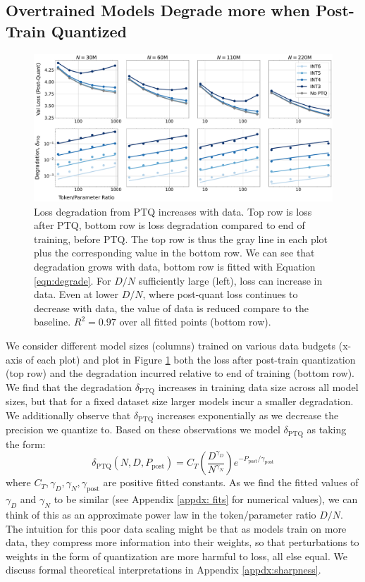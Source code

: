 \documentclass[11pt]{article}
\begin{document}
\subsection{Overtrained Models Degrade more when Post-Train Quantized}

\begin{figure}
    \centering
    \includegraphics[width=\linewidth]{tpr_gptq_new_evals.pdf}
    \caption{Loss degradation from PTQ increases with data. Top row is loss after PTQ, bottom row is loss degradation compared to end of training, before PTQ. The top row is thus the gray line in each plot plus the corresponding value in the bottom row. We can see that degradation grows with data, bottom row is fitted with Equation \ref{eqn:degrade}. For $D/N $ sufficiently large (left), loss can increase in data. Even at lower $D/N$, where post-quant loss continues to decrease with data, the value of data is reduced compare to the baseline. $R^2 = 0.97$ over all fitted points (bottom row).}
    \label{fig:tpr}
\end{figure}

We consider different model sizes (columns) trained on various data budgets (x-axis of each plot) and plot in Figure \ref{fig:tpr} both the loss after post-train quantization (top row) and the degradation incurred relative to end of training (bottom row). We find that the degradation $\delta_\text{PTQ}$ increases in training data size across all model sizes, but that for a fixed dataset size larger models incur a smaller degradation. We additionally observe that $\delta_{\text{PTQ}}$ increases exponentially as we decrease the precision we quantize to.
Based on these observations we model $\delta_\text{PTQ}$ as taking the form:
\begin{equation}
\label{eqn:degrade}
    \delta_\text{PTQ}(N, D, P_\text{post}) = C_T \left(\frac{D^{\gamma_D}}{N^{\gamma_N}}\right) e^{-P_\text{post}/\gamma_\text{post}}
\end{equation}
where $C_T, \gamma_D, \gamma_N, \gamma_\text{post}$ are positive fitted constants. As we find the fitted values of $\gamma_D$ and $\gamma_N$ to be similar (see Appendix \ref{appdx: fits} for numerical values), we can think of this as an approximate power law in the token/parameter ratio $D/N$. The intuition for this poor data scaling might be that as models train on more data, they compress more information into their weights, so that perturbations to weights in the form of quantization are more harmful to loss, all else equal. We discuss formal theoretical interpretations in Appendix \ref{appdx:sharpness}. 
\end{document}
